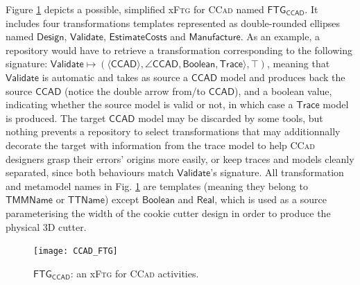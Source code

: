 Figure \ref{fig:CCAD-FTG} depicts a possible, simplified x\textsc{Ftg} for 
\textsc{CCad} named $\mathsf{FTG_{CCAD}}$. It includes four transformations 
templates represented as double-rounded ellipses named $\mathsf{Design}$, 
$\mathsf{Validate}$, $\mathsf{EstimateCosts}$ and $\mathsf{Manufacture}$. As an 
example, a repository would have to retrieve a transformation corresponding to 
the following signature: $\mathsf{Validate} \mapsto 
(\langle\mathsf{CCAD}\rangle, \angle \mathsf{CCAD}, \mathsf{Boolean}, 
\mathsf{Trace}\rangle, \top)$, meaning that $\mathsf{Validate}$ is automatic and 
takes as source a $\mathsf{CCAD}$ model and produces back the source 
$\mathsf{CCAD}$ (notice the double arrow from/to $\mathsf{CCAD}$), and a 
boolean value, indicating whether the source model is valid or not, in which 
case a $\mathsf{Trace}$ model is produced. The target $\mathsf{CCAD}$ model may 
be discarded by some tools, but nothing prevents a repository to select 
transformations that may additionnally decorate the target with information 
from the trace model to help \textsc{CCad} designers grasp their errors' 
origins more easily, or keep traces and models cleanly separated, since both 
behaviours match $\mathsf{Validate}$'s signature. All transformation and 
metamodel names in Fig. \ref{fig:CCAD-FTG} are templates (meaning they belong 
to $\mathsf{TMMName}$ or $\mathsf{TTName}$) except $\mathsf{Boolean}$ and 
$\mathsf{Real}$, which is used as a source parameterising the width of the 
cookie cutter design in order to produce the physical 3D cutter.

\begin{figure}[t]
   \centering
   \texttt{[image: CCAD\_FTG]}
   \caption{$\mathsf{FTG_{CCAD}}$: an x\textsc{Ftg} for \textsc{CCad} 
activities.}%
   \label{fig:CCAD-FTG}%
\end{figure}

